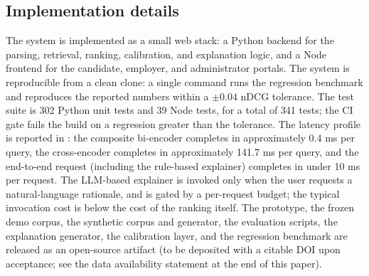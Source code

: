 \subsection{Implementation details}\label{sec:3.8}
The system is implemented as a small web stack: a Python backend for the parsing, retrieval, ranking, calibration, and explanation logic, and a Node frontend for the candidate, employer, and administrator portals.
The system is reproducible from a clean clone: a single command runs the regression benchmark and reproduces the reported numbers within a $\pm 0.04$ nDCG tolerance.
The test suite is 302 Python unit tests and 39 Node tests, for a total of 341 tests; the CI gate fails the build on a regression greater than the tolerance.
The latency profile is reported in : the composite bi-encoder completes in approximately 0.4 ms per query, the cross-encoder completes in approximately 141.7 ms per query, and the end-to-end request (including the rule-based explainer) completes in under 10 ms per request.
The LLM-based explainer is invoked only when the user requests a natural-language rationale, and is gated by a per-request budget; the typical invocation cost is below the cost of the ranking itself.
The prototype, the frozen demo corpus, the synthetic corpus and generator, the evaluation scripts, the explanation generator, the calibration layer, and the regression benchmark are released as an open-source artifact (to be deposited with a citable DOI upon acceptance; see the data availability statement at the end of this paper).

